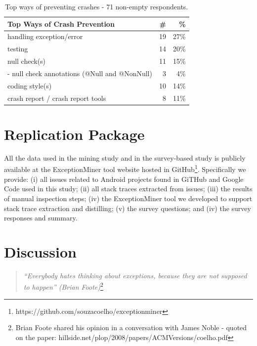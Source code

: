 

			
						
\begin{table}
\scriptsize
\centering
\begin{tabular}{lrr}
\hline
\bfseries{Top Ways of Crash Prevention} & \bfseries{\#} & \bfseries{\%} \\
\hline
handling exception/error  & 19 &	27\% \\
testing &	14 &	20\% \\
null check(s) &	11 &	15\% \\
- null check annotations (@Null and @NonNull)	& 3 & 	4\% \\
coding style(s)	& 10 &	14\% \\
crash report / crash report tools &	8	& 11\% \\
\hline
\end{tabular}
\caption{Top ways of preventing crashes - 71 non-empty respondents. }
\label{tab:topprevent}
\end{table}

\bigskip 


\section{Replication Package}
All the data used in the mining study and in the survey-based study is publicly available at the ExceptionMiner tool website hosted in GitHub\footnote{ https://github.com/souzacoelho/exceptionminer}.
Specifically we provide: (i) all issues related to Android projects found
in GiTHub and Google Code used in this study; (ii) all stack traces extracted
from issues; (iii) the results of manual inspection steps; (iv) the
ExceptionMiner tool we developed to support stack trace extraction and distilling; (v) the survey questions; and (iv) the survey responses and summary.

\section{Discussion}
\label{sec:disc}

\begin{quotation}
\noindent
 \emph{``Everybody hates thinking about exceptions, because they are not supposed to happen'' 
  (Brian Foote)}\footnote{Brian Foote shared his opinion in a conversation with James Noble - quoted on the paper: hillside.net/plop/2008/papers/ACMVersions/coelho.pdf}
\end{quotation}

